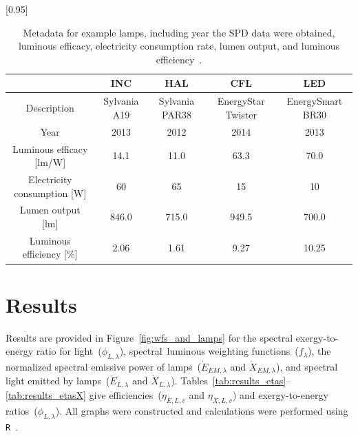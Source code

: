 \documentclass[energies,article,accept,moreauthors,pdftex]{Definitions/mdpi}\usepackage[]{graphicx}\usepackage[]{color}
\providecommand{\DIFdelbegin}{} %
\providecommand{\DIFdelend}{} %
\newcommand{\DIFscaledelfig}{0.5}
\newlength{\DIFdelgraphicswidth} %
\newlength{\DIFdelgraphicsheight} %
\newcommand{\DIFdelincludegraphics}[2][]{%
\sbox{\DIFdelgraphicsbox}{\DIFOincludegraphics[#1]{#2}}%
\settoboxwidth{\DIFdelgraphicswidth}{\DIFdelgraphicsbox} %
\settoboxtotalheight{\DIFdelgraphicsheight}{\DIFdelgraphicsbox} %
\scalebox{\DIFscaledelfig}{%
\parbox[b]{\DIFdelgraphicswidth}{\usebox{\DIFdelgraphicsbox}\\[-\baselineskip] \rule{\DIFdelgraphicswidth}{0em}}\llap{\resizebox{\DIFdelgraphicswidth}{\DIFdelgraphicsheight}{%
\setlength{\unitlength}{\DIFdelgraphicswidth}%
\begin{picture}(1,1)%
\thicklines\linethickness{2pt} %
{\color[rgb]{1,0,0}\put(0,0){\framebox(1,1){}}}%
{\color[rgb]{1,0,0}\put(0,0){\line( 1,1){1}}}%
{\color[rgb]{1,0,0}\put(0,1){\line(1,-1){1}}}%
\end{picture}%
}\hspace*{3pt}}} %
} %
\DeclareRobustCommand{\DIFdelbegin}{\DIFOdelbegin \let\includegraphics\DIFdelincludegraphics} %
\DeclareRobustCommand{\DIFdelend}{\DIFOaddend \let\includegraphics\DIFOincludegraphics} %
\begin{document}
\begin{table}[H]
\centering
\caption{Metadata for example lamps, including 
                     year the SPD data were obtained, 
                     luminous efficacy, 
                     electricity consumption rate, lumen output, and
                     luminous efficiency~\cite{aube2013}.} 
\label{tab:lamps}
\begingroup\footnotesize
\scalebox{0.95}[0.95]{
\begin{tabular}{ccccc}
  \toprule
 & \textbf{INC} & \textbf{HAL} & \textbf{CFL} & \textbf{LED} \\ 
  \midrule
Description & Sylvania A19 & Sylvania PAR38 & EnergyStar Twister & EnergySmart BR30 \\ 
  Year & 2013 & 2012 & 2014 & 2013 \\ 
  Luminous efficacy [lm/W] & 14.1 & 11.0 & 63.3 & 70.0 \\ 
  Electricity consumption [W] & 60 & 65 & 15 & 10 \\ 
  Lumen output [lm] & 846.0 & 715.0 & 949.5 & 700.0 \\ 
  Luminous efficiency [\%] &  2.06 &  1.61 &  9.27 & 10.25 \\ 
   \bottomrule
\end{tabular}}
\endgroup
\end{table}




\section{Results}
\label{sec:results}

\DIFdelbegin %

\DIFdelend Results are provided in Figure~\ref{fig:wfs_and_lamps} for 
the spectral exergy-to-energy ratio for light~($\phi_{L,\lambda}$), 
\mbox{spectral luminous} weighting functions~($f_\lambda$),
the normalized spectral emissive power of lamps~($\dot{E}_{EM,\lambda}$ and $\dot{X}_{EM,\lambda}$), and
spectral light emitted by lamps~($\dot{E}_{L,\lambda}$ and $\dot{X}_{L,\lambda}$).
Tables~\ref{tab:results_etas}--\ref{tab:results_etasX}
give efficiencies~($\eta_{E,L,v}$ and $\eta_{X,L,v}$) and exergy-to-energy ratios~($\phi_{L,\lambda}$).
All graphs were constructed and calculations were performed using \texttt{R}~\cite{R-software}.
\end{document}
